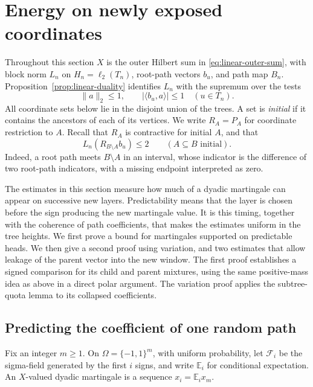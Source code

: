 \section{Energy on newly exposed coordinates}\label{sec:linear-energy}

Throughout this section \(X\) is the outer Hilbert sum in
\eqref{eq:linear-outer-sum}, with block norm \(L_n\) on
\(H_n=\ell_2(T_n)\), root-path vectors \(b_u\), and path map \(B_n\).
Proposition~\ref{prop:linear-duality} identifies \(L_n\) with the
supremum over the tests
\begin{equation}\label{eq:linear-energy-tests}
 \|a\|_2\le1,\qquad |\langle b_u,a\rangle|\le1\quad(u\in T_n).
\end{equation}
All coordinate sets below lie in the disjoint union of the trees.  A set
is \emph{initial} if it contains the ancestors of each of its vertices.
We write \(R_A=P_A\) for coordinate restriction to \(A\).  Recall that
\(R_A\) is contractive for initial \(A\), and that
\begin{equation}
 L_n(R_{B\setminus A}b_u)\le2\qquad(A\subseteq B\text{ initial}).
 \label{eq:linear-window-path}
\end{equation}
Indeed, a root path meets \(B\setminus A\) in an interval, whose
indicator is the difference of two root-path indicators, with a missing
endpoint interpreted as zero.

The estimates in this section measure how much of a dyadic martingale
can appear on successive new layers.  Predictability means that the
layer is chosen before the sign producing the new martingale value.
It is this timing, together with the coherence of path coefficients,
that makes the estimates uniform in the tree heights.  We first prove
a bound for martingales supported on predictable heads.  We then give a
second proof using variation, and two estimates that allow leakage of
the parent vector into the new window. The first proof establishes a
signed comparison for its child and parent mixtures, using the same
positive-mass idea as above in a direct polar argument. The variation
proof applies the subtree-quota lemma to its collapsed coefficients.

\subsection{Predicting the coefficient of one random path}

Fix an integer \(m\ge1\).  On \(\Omega=\{-1,1\}^m\), with uniform
probability, let \(\mathcal F_i\)
be the sigma-field generated by the first \(i\) signs, and write
\(\mathbb E_i\) for conditional expectation.  An \(X\)-valued dyadic
martingale is a sequence \(x_i=\mathbb E_i x_m\).

